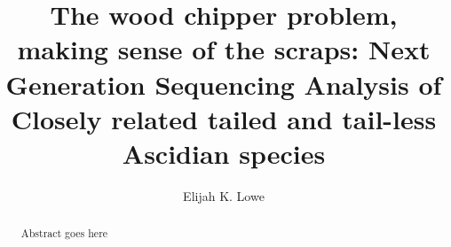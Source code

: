 \documentclass{msuphddissertation}
\author{Elijah K. Lowe} %
\title{The wood chipper problem, making sense of the scraps: Next Generation Sequencing Analysis of Closely related tailed and tail-less Ascidian species} %
\begin{document}
\maketitlepage %
\begin{abstract}
Abstract goes here
\end{abstract}



\begin{dedication}
\begin{center} 

\end{center}
\end{dedication}

\begin{acknowledgment}

\end{acknowledgment}


\TOC

\LOT

\LOF

\end{document}
